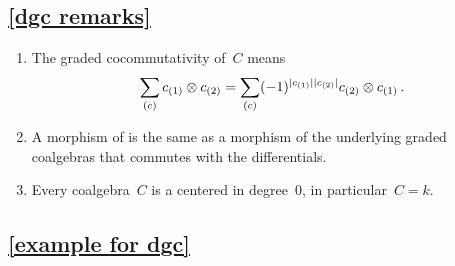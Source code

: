 \subsection{\cref{dgc remarks}}
\label{dgc remarks proof}

\begin{enumerate}
  \item
    The graded cocommutativity of~$C$ means
    \[
      \sum_{(c)} c_{(1)} \otimes c_{(2)}
      =
      \sum_{(c)} (-1)^{\lvert c_{(1)}\rvert \lvert c_{(2)}\rvert} c_{(2)} \otimes c_{(1)} \,.
    \]
  \item
    A morphism of {\dgcs} is the same as a morphism of the underlying graded coalgebras that commutes with the differentials.
  \item
    Every coalgebra~$C$ is a {\dgc} centered in degree~$0$, in particular~$C = k$.
\end{enumerate}



\subsection{\cref{example for dgc}}
\label{example for dgc proof}

